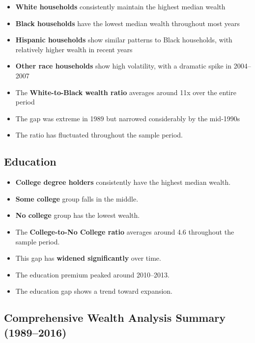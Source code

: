\documentclass[
  12pt]{article}
\providecommand{\tightlist}{%
  \setlength{\itemsep}{0pt}\setlength{\parskip}{0pt}}\usepackage{longtable,booktabs,array}
\begin{document}
\begin{itemize}
\tightlist
\item
  \textbf{White households} consistently maintain the highest median
  wealth
\item
  \textbf{Black households} have the lowest median wealth throughout
  most years
\item
  \textbf{Hispanic households} show similar patterns to Black
  households, with relatively higher wealth in recent years
\item
  \textbf{Other race households} show high volatility, with a dramatic
  spike in 2004--2007
\item
  The \textbf{White-to-Black wealth ratio} averages around 11x over the
  entire period
\item
  The gap was extreme in 1989 but narrowed considerably by the mid-1990s
\item
  The ratio has fluctuated throughout the sample period.
\end{itemize}

\subsection{Education}\label{education}

\begin{itemize}
\tightlist
\item
  \textbf{College degree holders} consistently have the highest median
  wealth.
\item
  \textbf{Some college} group falls in the middle.
\item
  \textbf{No college} group has the lowest wealth.
\item
  The \textbf{College-to-No College ratio} averages around 4.6
  throughout the sample period.
\item
  This gap has \textbf{widened significantly} over time.
\item
  The education premium peaked around 2010--2013.
\item
  The education gap shows a trend toward expansion.
\end{itemize}

\subsection{Comprehensive Wealth Analysis Summary
(1989--2016)}\label{comprehensive-wealth-analysis-summary-19892016}
\end{document}
